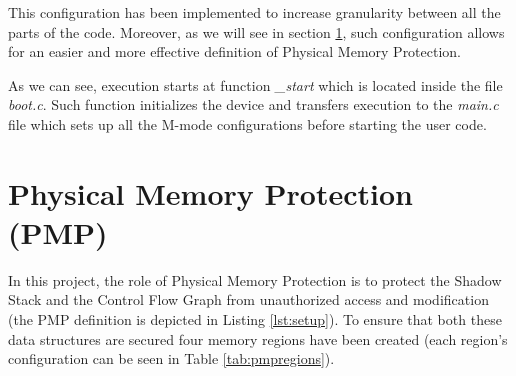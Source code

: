 This configuration has been implemented to increase granularity between all the parts
of the code. Moreover, as we will see in section \ref{sec:project_pmp}, such
configuration allows for an easier and more effective definition of Physical
Memory Protection.

As we can see, execution starts at function \textit{\_start} which is located
inside the file \textit{boot.c}. Such function initializes the device and
transfers execution to the \textit{main.c} file which sets up all the M-mode configurations
before starting the user code.

\section{Physical Memory Protection (PMP)}
\label{sec:project_pmp}

In this project, the role of Physical Memory Protection is to protect the Shadow
Stack and the Control Flow Graph from unauthorized access and modification (the
PMP definition is depicted in Listing \ref{lst:setup}). To ensure that both
these data structures are secured four memory regions have been created (each region's
configuration can be seen in Table \ref{tab:pmpregions}).


